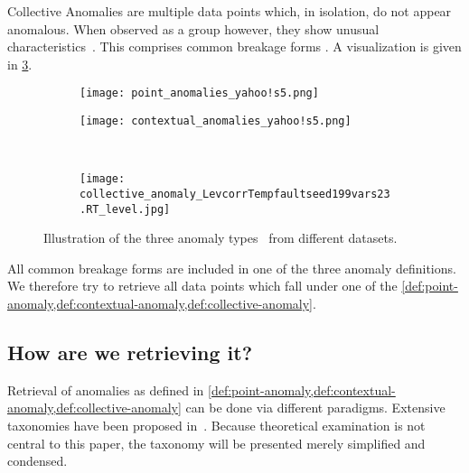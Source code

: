 \begin{definition}\label{def:collective-anomaly}
    Collective Anomalies are multiple data points which, in isolation, do not appear
    anomalous. When observed as a group however, they show unusual
    characteristics~\cite[cf.][]{Chandola.2009}. This comprises common breakage
    forms . A visualization is given in
    \cref{fig:collective-anomaly}.
\end{definition}

\begin{figure}[htp!]
    \begin{subfigure}[b]{.45\linewidth}
        \centering
        \texttt{[image: point\_anomalies\_yahoo!s5.png]}
        \label{fig:point-anomaly}
    \end{subfigure}%
    \hfill
    \begin{subfigure}[b]{.45\linewidth}
        \centering
        \texttt{[image: contextual\_anomalies\_yahoo!s5.png]}
        \label{fig:contextual-anomaly}
    \end{subfigure}\\[1ex]
    \begin{subfigure}[b]{\linewidth}
        \centering
        \texttt{[image: collective\_anomaly\_LevcorrTempfaultseed199vars23.RT\_level.jpg]}
        \label{fig:collective-anomaly}
    \end{subfigure}
    \caption{Illustration of the three anomaly types~\cite{Chandola.2009} from different datasets.}\label{fig:anomaly-types}
\end{figure}

All common breakage forms are included in one of the three anomaly definitions.
We therefore try to retrieve all data points which fall under one of the
\cref{def:point-anomaly,def:contextual-anomaly,def:collective-anomaly}.


\subsection{How are we retrieving it?}
Retrieval of anomalies as defined in \cref{def:point-anomaly,def:contextual-anomaly,def:collective-anomaly}
can be done via different paradigms. Extensive taxonomies have been proposed in~\cite{Chandola.2009,Zietlow.2020}.
Because theoretical examination is not central to this paper, the taxonomy will
be presented merely simplified and condensed.

